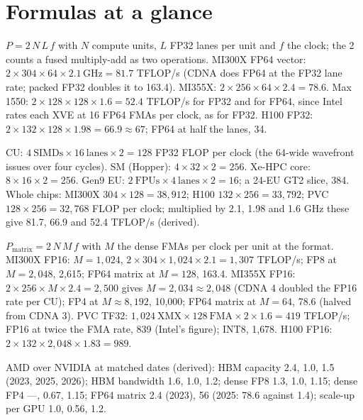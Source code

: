 \documentclass[11pt,letterpaper]{article}
\begin{document}
\clearpage
\section{Formulas at a glance}

\begin{description}[leftmargin=0pt,labelindent=0pt,itemsep=6pt,font=\normalfont\bfseries\sffamily]\sloppy
\item[Vector peak.] $P = 2\,N\,L\,f$ with $N$ compute units, $L$ FP32 lanes per unit and $f$ the clock; the 2 counts a fused multiply-add as two operations. MI300X FP64 vector: $2\times 304\times 64\times 2.1\,\mathrm{GHz} = 81.7$ TFLOP/s (CDNA does FP64 at the FP32 lane rate; packed FP32 doubles it to 163.4). MI355X: $2\times 256\times 64\times 2.4 = 78.6$. Max 1550: $2\times 128\times 128\times 1.6 = 52.4$ TFLOP/s for FP32 and for FP64, since Intel rates each XVE at 16 FP64 FMAs per clock, as for FP32. H100 FP32: $2\times 132\times 128\times 1.98 = 66.9 \approx 67$; FP64 at half the lanes, 34.
\item[FLOP per clock per unit.] CU: $4\ \text{SIMDs}\times 16\ \text{lanes}\times 2 = 128$ FP32 FLOP per clock (the 64-wide wavefront issues over four cycles). SM (Hopper): $4\times 32\times 2 = 256$. Xe-HPC core: $8\times 16\times 2 = 256$. Gen9 EU: $2\ \text{FPUs}\times 4\ \text{lanes}\times 2 = 16$; a 24-EU GT2 slice, 384. Whole chips: MI300X $304\times 128 = 38{,}912$; H100 $132\times 256 = 33{,}792$; PVC $128\times 256 = 32{,}768$ FLOP per clock; multiplied by 2.1, 1.98 and 1.6 GHz these give 81.7, 66.9 and 52.4 TFLOP/s (derived).
\item[Matrix peak.] $P_{\text{matrix}} = 2\,N\,M\,f$ with $M$ the dense FMAs per clock per unit at the format. MI300X FP16: $M = 1{,}024$, $2\times 304\times 1{,}024\times 2.1 = 1{,}307$ TFLOP/s; FP8 at $M = 2{,}048$, 2{,}615; FP64 matrix at $M = 128$, 163.4. MI355X FP16: $2\times 256\times M\times 2.4 = 2{,}500$ gives $M = 2{,}034 \approx 2{,}048$ (CDNA 4 doubled the FP16 rate per CU); FP4 at $M \approx 8{,}192$, 10{,}000; FP64 matrix at $M = 64$, 78.6 (halved from CDNA 3). PVC TF32: $1{,}024\ \text{XMX}\times 128\ \text{FMA}\times 2\times 1.6 = 419$ TFLOP/s; FP16 at twice the FMA rate, 839 (Intel's figure); INT8, 1{,}678. H100 FP16: $2\times 132\times 2{,}048\times 1.83 = 989$.
\item[Per-generation ratios.] AMD over NVIDIA at matched dates (derived): HBM capacity 2.4, 1.0, 1.5 (2023, 2025, 2026); HBM bandwidth 1.6, 1.0, 1.2; dense FP8 1.3, 1.0, 1.15; dense FP4 ---, 0.67, 1.15; FP64 matrix 2.4 (2023), 56 (2025: 78.6 against 1.4); scale-up per GPU 1.0, 0.56, 1.2.

\end{description}
\end{document}
